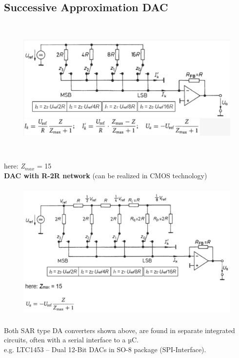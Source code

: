 \subsection{Successive Approximation DAC}

    \begin{figure}[h]
    \centering
    \includegraphics[width=14cm, height=7cm]{Images/image32.png}
    \label{fig:Fig 119}
    \end{figure}

here: \textit{Z}${}_{max}$ = 15\\

{\rot\bf DAC with R-2R network} (can be realized in CMOS technology)

    \begin{figure}[h]
    \centering
    \includegraphics[width=14cm, height=7cm]{Images/image166.png}
    \label{fig:Fig 120}
    \end{figure}

Both SAR type DA converters shown above, are found in separate integrated circuits, often with a serial interface to a µC. \\

e.g. LTC1453 -- Dual 12-Bit DACs in SO-8 package (SPI-Interface).\\

